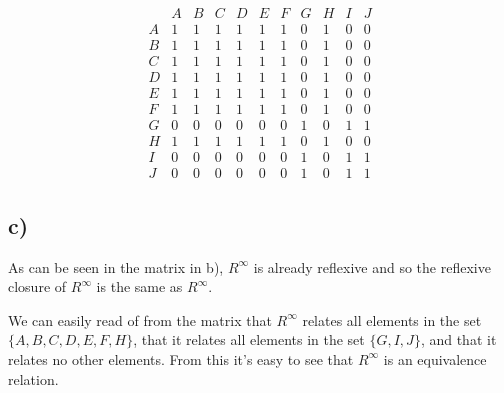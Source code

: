 \documentclass[a4paper]{article}
\begin{document}
\[
\begin{array}{l|c|c|c|c|c|c|c|c|c|c}
   & A & B & C & D & E & F & G & H & I & J \\
\hline
A & 1 & 1 & 1 & 1 & 1 & 1 & 0 & 1 & 0 & 0 \\
\hline
B & 1 & 1 & 1 & 1 & 1 & 1 & 0 & 1 & 0 & 0 \\
\hline
C & 1 & 1 & 1 & 1 & 1 & 1 & 0 & 1 & 0 & 0 \\
\hline
D & 1 & 1 & 1 & 1 & 1 & 1 & 0 & 1 & 0 & 0 \\
\hline
E & 1 & 1 & 1 & 1 & 1 & 1 & 0 & 1 & 0 & 0 \\
\hline
F & 1 & 1 & 1 & 1 & 1 & 1 & 0 & 1 & 0 & 0 \\
\hline
G & 0 & 0 & 0 & 0 & 0 & 0 & 1 & 0 & 1 & 1 \\
\hline
H & 1 & 1 & 1 & 1 & 1 & 1 & 0 & 1 & 0 & 0 \\
\hline
I & 0 & 0 & 0 & 0 & 0 & 0 & 1 & 0 & 1 & 1 \\
\hline
J & 0 & 0 & 0 & 0 & 0 & 0 & 1 & 0 & 1 & 1
\end{array}
\]

\subsection*{c)}

As can be seen in the matrix in b), \(R^\infty\) is already reflexive and so the reflexive closure of \(R^\infty\) is the same as \(R^\infty\).

We can easily read of from the matrix that \(R^\infty\) relates all elements in the set \(\{A, B, C, D, E, F, H\}\), that it relates all elements in the set \(\{G, I, J\}\), and that it relates no other elements. From this it's easy to see that \(R^\infty\) is an equivalence relation.
\end{document}
